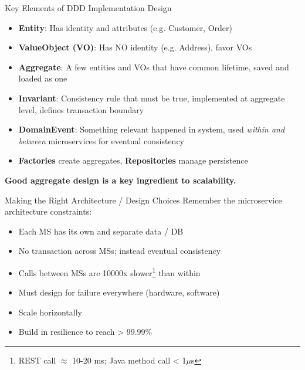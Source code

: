 \begin{frame}[t]{Key Elements of DDD Implementation Design}
\begin{itemize}
    \item \textbf{Entity}: Has identity and attributes (e.g. Customer, Order)
    \item \textbf{ValueObject (VO)}: Has NO identity (e.g. Address), favor VOs
    \item \textbf{Aggregate}: A few entities and VOs that have common lifetime, saved and loaded as one
    \item \textbf{Invariant}: Consistency rule that must be true, implemented at aggregate level, defines transaction boundary
    \item \textbf{DomainEvent}: Something relevant happened in system, used \textit{within and between} microservices for eventual consistency
    \item \textbf{Factories} create aggregates, \textbf{Repositories} manage persistence
\end{itemize}
\textbf{Good aggregate design is a key ingredient to scalability.}
\end{frame}


\begin{frame}[t]{Making the Right Architecture / Design Choices}
Remember the microservice architecture constraints:
\begin{itemize}
    \item Each MS has its own and separate data / DB
    \item No transaction across MSs; instead eventual consistency
    \item Calls between MSs are 10000x slower\footnote{REST call $\approx$ 10-20 ms; Java method call < 1$\mu$s} than within
    \item Must design for failure everywhere (hardware, software)
    \item Scale horizontally
    \item Build in resilience to reach > 99.99\%
\end{itemize}
\end{frame}



